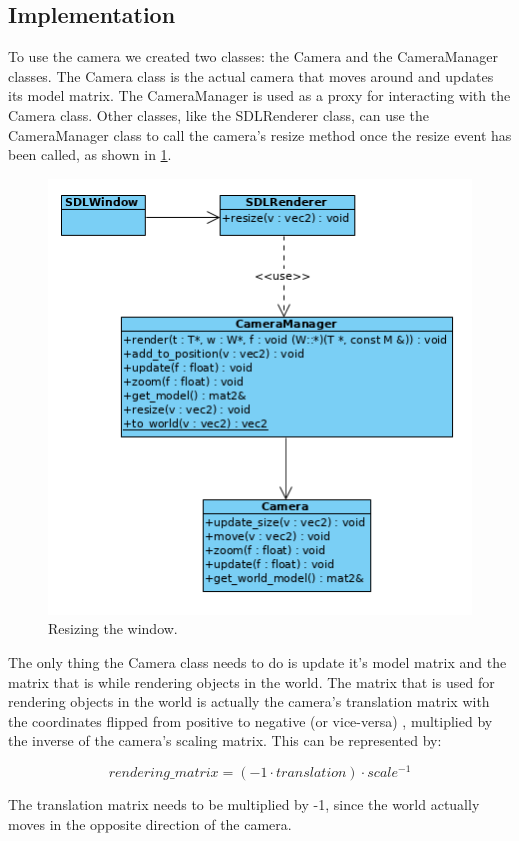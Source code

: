 \subsection{Implementation}
To use the camera we created two classes: the Camera and the CameraManager 
classes. The Camera class is the actual camera that moves around and updates 
its model matrix. The CameraManager is used as a proxy for interacting with 
the Camera class. Other classes, like the SDLRenderer class, can use the 
CameraManager class to call the camera's resize method once the resize event 
has been called, as shown in \cref{fig:renderer-resize}.

\begin{figure}[!htb]
    \centering
    \includegraphics[scale=0.75]{res/renderer-resize.png}
    \caption{Resizing the window.}\label{fig:renderer-resize}
\end{figure}

The only thing the Camera class needs to do is update it's model matrix and 
the matrix that is while rendering objects in the world. The matrix that is 
used for rendering objects in the world is actually the camera's translation 
matrix with the coordinates flipped from positive to negative (or vice-versa)
, multiplied by the inverse of the camera's scaling matrix.
This can be represented by:

$$ rendering\_matrix = (-1 \cdot translation) \cdot scale^{-1} $$

The translation matrix needs to be multiplied by -1, since the world actually 
moves in the opposite direction of the camera.

